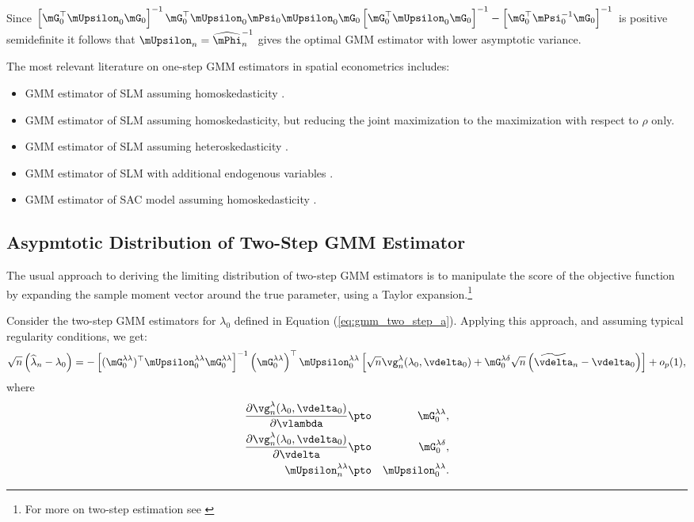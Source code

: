 Since $\left[\mG^\top_0\mUpsilon_0\mG_0\right]^{-1}\mG^\top_0\mUpsilon_0\mPsi_0\mUpsilon_0\mG_0\left[\mG^\top_0\mUpsilon_0\mG_0\right]^{-1} - \left[\mG^\top_0\mPsi^{-1}_0\mG_0\right]^{-1}$ is positive semidefinite it follows that $\mUpsilon_n= \widehat{\mPhi}^{-1}_n$ gives the optimal GMM estimator with lower asymptotic variance. 

The most relevant literature on one-step GMM estimators in spatial econometrics includes:
\begin{itemize}
  \item GMM estimator of SLM assuming homoskedasticity \citep{lee2007gmm}.
  \item GMM estimator of SLM assuming homoskedasticity, but reducing the joint maximization to the maximization with respect to $\rho$ only. 
  \item GMM estimator of SLM assuming heteroskedasticity \citep{lin2010gmm}. 
  \item GMM estimator of SLM with additional endogenous variables \citep{liu2015gmm}.
  \item GMM estimator of SAC model assuming homoskedasticity \citep{lee2010efficient, liu2010efficient}.
\end{itemize}

\subsection{Asypmtotic Distribution of Two-Step GMM Estimator}\label{section:2step-gmm}

The usual approach to deriving the limiting distribution of two-step GMM estimators is to manipulate the score of the objective function by expanding the sample moment vector around the true parameter, using a Taylor expansion.\footnote{For more on two-step estimation see \citet[][section 6]{newey1994large}}

Consider the two-step GMM estimators for $\lambda_0$ defined in Equation (\ref{eq:gmm_two_step_a}). Applying this approach, and assuming typical regularity conditions, we get:
\begin{equation}\label{eq:taylor_gmm_1}
\sqrt{n}\left(\widehat{\lambda}_n - \lambda_0\right) = - \left[(\mG_0^{\lambda\lambda})^\top\mUpsilon_0^{\lambda\lambda}\mG_0^{\lambda\lambda}\right]^{-1}\left(\mG_0^{\lambda\lambda}\right)^\top\mUpsilon_0^{\lambda\lambda}\left[\sqrt{n}\vg_n^{\lambda}(\lambda_0, \vdelta_0) + \mG_0^{\lambda\delta}\sqrt{n}\left(\widetilde{\vdelta}_n - \vdelta_0\right)\right] + o_p(1),
\end{equation}
%
where
\begin{eqnarray*}
	\frac{\partial \vg_n^{\lambda}(\lambda_0, \vdelta_0)}{\partial \vlambda} &\pto&  \mG^{\lambda\lambda}_0, \\
	\frac{\partial \vg_n^{\lambda}(\lambda_0, \vdelta_0)}{\partial \vdelta} &\pto&  \mG^{\lambda\delta}_0, \\
	\mUpsilon^{\lambda\lambda}_n & \pto & \mUpsilon^{\lambda\lambda}_0.
\end{eqnarray*}

